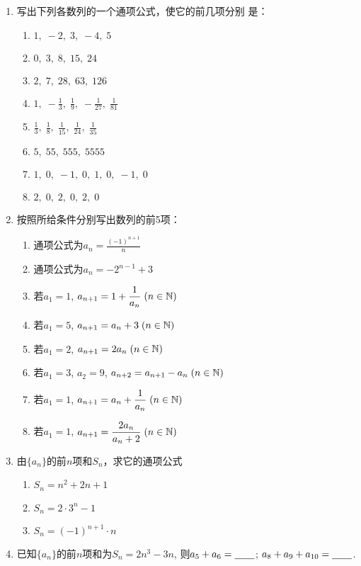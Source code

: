 \begin{enumerate}
    \item 写出下列各数列的一个通项公式，使它的前几项分别
    是：
\begin{multicols}{2}
\begin{enumerate}[(1)]
    \item $1,\; -2,\; 3,\; -4,\; 5$
    \item $0,\; 3,\; 8,\; 15,\; 24$
    \item $2,\; 7,\; 28,\; 63,\; 126$
    \item $1,\; -\frac{1}{3},\; \frac{1}{9},\; -\frac{1}{27},\; \frac{1}{81}$
    \item $\frac{1}{3},\; \frac{1}{8},\; \frac{1}{15},\; \frac{1}{24},\; \frac{1}{35}$
    \item $5,\; 55,\; 555,\; 5555$
    \item $1,\; 0,\; -1,\; 0,\; 1,\; 0,\; -1,\; 0$
    \item $2,\; 0,\; 2,\; 0,\; 2,\; 0$
\end{enumerate}    
\end{multicols}

\item 按照所给条件分别写出数列的前5项：
\begin{enumerate}[(1)]
    \item 通项公式为$a_n=\frac{(-1)^{n+1}}{n}$
    \item 通项公式为$a_n=-2^{n-1}+3$
    \item 若$a_1=1$, $a_{n+1}=1+\dfrac{1}{a_n}\; (n\in\mathbb{N})$
    \item 若$a_1=5$, $a_{n+1}={a_n}+3\; (n\in\mathbb{N})$
    \item 若$a_1=2$, $a_{n+1}=2{a_n}\; (n\in\mathbb{N})$
    \item 若$a_1=3$, $a_2=9$, $a_{n+2}=a_{n+1}-{a_n}\; (n\in\mathbb{N})$
    \item 若$a_1=1$, $a_{n+1}=a_n+\dfrac{1}{a_n}\; (n\in\mathbb{N})$
    \item 若$a_1=1$, $a_{n+1}=\dfrac{2a_n}{a_n+2}\; (n\in\mathbb{N})$
\end{enumerate}

\item 由$\{a_n\}$的前$n$项和$S_n$，求它的通项公式
\begin{multicols}{3}
\begin{enumerate}[(1)]
    \item $S_n=n^2+2n+1$
    \item $S_n=2\cdot 3^n-1$
    \item $S_n=(-1)^{n+1}\cdot n$
\end{enumerate}
\end{multicols}

\item 已知$\{a_n\}$的前$n$项和为$S_n=2n^3-3n$, 
则$a_5+a_6=\underline{\qquad}$; $a_8+a_9+a_{10}=\underline{\qquad}$.
\end{enumerate}

